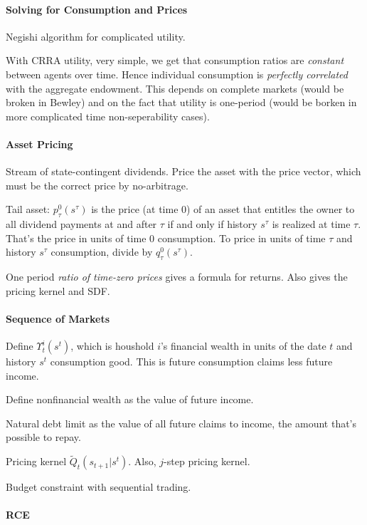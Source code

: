 \documentclass[12pt]{article}
\theoremstyle{plain}
\theoremstyle{definition}
\theoremstyle{remark}
\begin{document}
\paragraph{Solving for Consumption and Prices}
Negishi algorithm for complicated utility.

With CRRA utility, very simple, we get that consumption ratios are
\emph{constant} between agents over time.
Hence individual consumption is \emph{perfectly correlated} with the
aggregate endowment.
This depends on complete markets (would be broken in Bewley) and on the
fact that utility is one-period (would be borken in more complicated
time non-seperability cases).

\paragraph{Asset Pricing}
Stream of state-contingent dividends.
Price the asset with the price vector, which must be the correct price
by no-arbitrage.

Tail asset: $p_\tau^0(s^\tau)$ is the price (at time 0) of an asset that
entitles the owner to all dividend payments at and after $\tau$ if and
only if history $s^\tau$ is realized at time $\tau$.
That's the price in units of time 0 consumption.
To price in units of time $\tau$ and history $s^\tau$ consumption,
divide by $q_\tau^0(s^\tau)$.

One period \emph{ratio of time-zero prices} gives a formula for returns.
Also gives the pricing kernel and SDF.

\paragraph{Sequence of Markets}
Define $\Upsilon_t^i(s^t)$, which is houshold $i$'s financial wealth in
units of the date $t$ and history $s^t$ consumption good.
This is future consumption claims less future income.

Define nonfinancial wealth as the value of future income.

Natural debt limit as the value of all future claims to income, the
amount that's possible to repay.

Pricing kernel $\tilde{Q}_t(s_{t+1}|s^t)$.
Also, $j$-step pricing kernel.

Budget constraint with sequential trading.


\paragraph{RCE}
\end{document}
